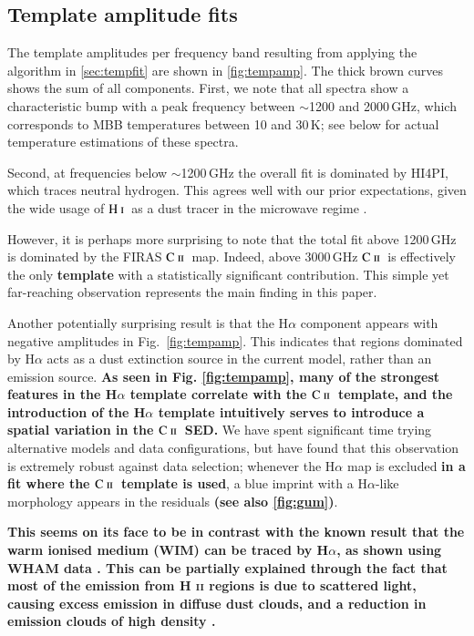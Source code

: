 \documentclass{aa}
\newcommand{\mathsc}[1]{{\normalfont\textsc{#1}}}
\newcommand{\CII}{\ensuremath{\mathsc{C\ ii}}}
\newcommand{\HI}{\ensuremath{\mathsc{H\ i}}}
\begin{document}
\subsection{Template amplitude fits}
\label{sec:tempamp}

The template amplitudes per frequency band resulting from applying the
algorithm in \cref{sec:tempfit} are shown in \cref{fig:tempamp}. The
thick brown curves shows the sum of all components. First, we note
that all spectra show a characteristic bump with a peak frequency
between $\sim$1200 and 2000\,GHz, which corresponds to MBB
temperatures between 10 and 30\,K; see below for actual temperature
estimations of these spectra.

Second, at frequencies below $\sim$1200\,GHz the overall fit is
dominated by HI4PI, which traces neutral hydrogen. This agrees well
with our prior expectations, given the wide usage of \HI\ as a dust
tracer in the microwave regime
\citep[e.g.,][]{planck2011-6.6,lenz:2017,Hensley2023}.

However, it is perhaps more surprising to note that the total fit
above 1200\,GHz is dominated by the FIRAS \CII\ map. Indeed, above
3000\,GHz \CII\ is effectively the only \textbf{template} with a statistically
significant contribution. This simple yet far-reaching observation
represents the main finding in this paper.

Another potentially surprising result is that the H$\alpha$ component
appears with negative amplitudes in Fig.~\ref{fig:tempamp}. This
indicates that regions dominated by H$\alpha$ acts as a dust
extinction source in the current model, rather than an emission
source. \textbf{As seen in Fig. \ref{fig:tempamp}, many of the strongest features in the H$\alpha$ template correlate with the \CII\ template, and the introduction of the H$\alpha$ template intuitively serves to introduce a spatial variation in the \CII\ SED.}
We have spent significant time trying alternative models
and data configurations, but have found that this observation is
extremely robust against data selection; whenever the H$\alpha$ map is
excluded \textbf{in a fit where the \CII\ template is used}, a blue imprint
with a H$\alpha$-like morphology appears in the residuals \textbf{(see also \cref{fig:gum})}.

\textbf{
	This seems on its face to be in contrast with the known result that the warm ionised medium (WIM) can be traced by H$\alpha$, as shown using WHAM data \citep{lagache2000}. %
	This can be partially explained through the fact that most of the emission from \textsc{H ii} regions is due to scattered light, causing excess emission in diffuse dust clouds, and a reduction in emission clouds of high density \citep{mattila2007}. %
}
\end{document}
